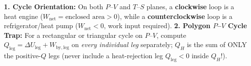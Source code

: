 \begin{quicksheet}
\begin{trapbox}
\footnotesize
\textbf{1. Cycle Orientation:} On both $P$--$V$ and $T$--$S$ planes, a \textbf{clockwise} loop is a heat engine ($W_{\mathrm{net}} = \text{enclosed area} > 0$), while a \textbf{counterclockwise} loop is a refrigerator/heat pump ($W_{\mathrm{net}} < 0$, work input required).
\textbf{2. Polygon $P$--$V$ Cycle Trap:} For a rectangular or triangular cycle on $P$--$V$, compute $Q_{\mathrm{leg}} = \Delta U_{\mathrm{leg}} + W_{\mathrm{by,leg}}$ on \emph{every individual leg} separately; $Q_H$ is the sum of ONLY the positive-$Q$ legs (never include a heat-rejection leg $Q_{\mathrm{leg}} < 0$ inside $Q_H$!).
\end{trapbox}
\end{quicksheet}

